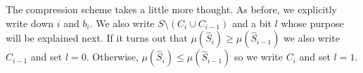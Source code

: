 \documentclass{article}
\begin{document}
The compression scheme takes a little more thought. As before, we explicitly write down $i$ and $b_i$. We also write $S \setminus (C_i \cup C_{i-1})$ and a bit $l$ whose purpose will be explained next. If it turns out that $\mu(\hat{S}_i) \geqslant \mu(\hat{S}_{i-1})$ we also write $C_{i-1}$ and set $l = 0$. Otherwise, $\mu(\hat{S}_i) \leqslant \mu(\hat{S}_{i-1})$ so we write $C_{i}$ and set $l = 1$.

\end{document}
